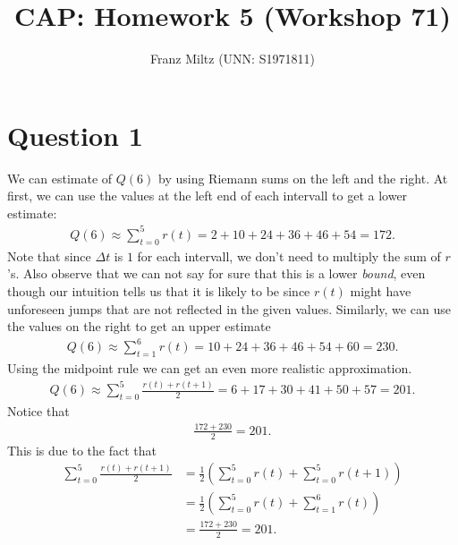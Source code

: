 \documentclass{article}
\title{CAP: Homework 5 (Workshop 71)}
\author{Franz Miltz (UNN: S1971811)}
\begin{document}
\maketitle
\section*{Question 1}
We can estimate of $Q(6)$ by using Riemann sums on the left and the right.
At first, we can use the values at the left end of each intervall to get a lower estimate:
\begin{align*}
  Q(6) \approx \sum_{t=0}^5 r(t)=2 + 10 + 24 +36 + 46+54=172.
\end{align*}
Note that since $\Delta t$ is $1$ for each intervall, we don't need to multiply the sum of $r$'s.
Also observe that we can not say for sure that this is a lower \emph{bound}, even though our intuition tells us that it is likely to be since $r(t)$ might have unforeseen jumps that are not reflected in the given values.
Similarly, we can use the values on the right to get an upper estimate
\begin{align*}
  Q(6) \approx \sum_{t=1}^6 r(t)=10+24+36+46+54+60=230.
\end{align*}
Using the midpoint rule we can get an even more realistic approximation.
\begin{align*}
  Q(6)\approx \sum_{t=0}^5 \frac{r(t)+r(t+1)}{2}=6+17+30+41+50+57=201.
\end{align*}
Notice that
\begin{align*}
  \frac{172+230}{2}=201.
\end{align*}
This is due to the fact that
\begin{align*}
  \sum_{t=0}^5\frac{r(t)+r(t+1)}{2}
   & =\frac{1}{2}\left(\sum_{t=0}^5 r(t)+\sum_{t=0}^5 r(t+1)\right) \\
   & =\frac{1}{2}\left(\sum_{t=0}^5 r(t)+\sum_{t=1}^6 r(t)\right)   \\
   & =\frac{172+230}{2}=201.
\end{align*}
\end{document}
